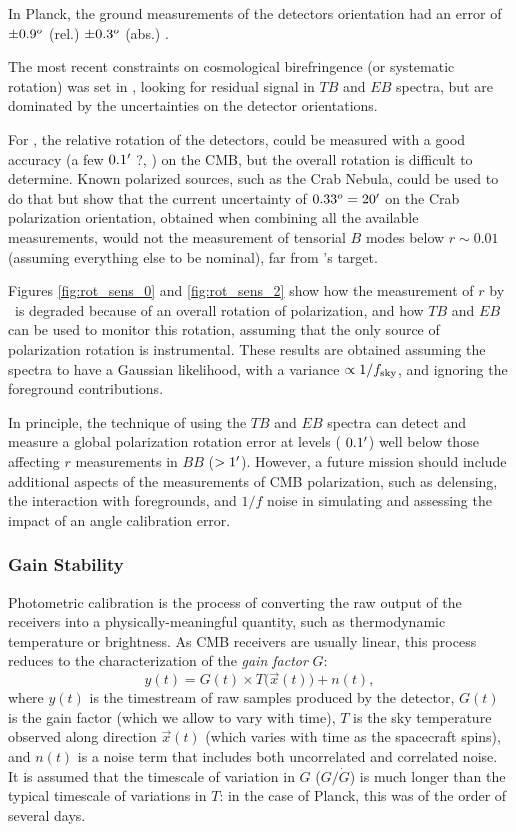 \documentclass[PICOReport.tex]{subfiles}
\begin{document}
In Planck, the ground measurements of the detectors orientation had an error of $\pm 0.9^o$ (rel.) $\pm 0.3^o$ (abs.) \citep{Rosset+2010}.

The most recent constraints on cosmological birefringence (or systematic rotation) was set in \citet{Planck2016_XLIX}, looking for residual signal in $TB$ and $EB$ spectra, but are dominated by the uncertainties on the detector orientations.

For \pico, the relative rotation of the detectors, could be measured with a good accuracy (a few $0.1'$ ?, ) on the CMB, but the overall rotation is difficult to determine.
Known polarized sources, such as the Crab Nebula, could be used to do that but \citet{Aumont+2018} show that the current uncertainty of $0.33^o = 20'$ on the Crab polarization orientation, obtained when combining all the available measurements, 
would not the measurement of tensorial $B$ modes below $r \sim 0.01$ (assuming everything else to be nominal), far from \pico's target.

Figures \ref{fig:rot_sens_0} and \ref{fig:rot_sens_2} show how the measurement of $r$ by \pico\ is degraded because of an overall rotation of polarization, and how $TB$ and $EB$ can be used to monitor this rotation, assuming that the only source of polarization rotation is instrumental.
These results are obtained assuming the spectra to have a Gaussian likelihood, with a variance $\propto 1/f_{\rm sky}$, and ignoring the foreground contributions.

In principle, the technique of using the $TB$ and $EB$ spectra can detect and measure a global polarization rotation error at levels ($~0.1 '$) well below those affecting $r$ measurements in $BB$ ($> 1 '$).  However, a future mission should include additional aspects of the measurements of CMB polarization, such as delensing, the interaction with foregrounds, and $1/f$ noise in simulating and assessing the impact of an angle calibration error.

\subsubsection{Gain Stability}
\label{sec:gain}
Photometric calibration is the process of converting the raw output of the receivers into a physically-meaningful quantity, such as thermodynamic temperature or brightness. As CMB receivers are usually linear, this process reduces to the characterization of the \emph{gain factor} $G$:
\begin{equation}
\label{eq:gainStability:Response}
y(t) = G(t) \times T\bigl(\vec{x}(t)\bigr) + n(t),
\end{equation}
where $y(t)$ is the timestream of raw samples produced by the detector, $G(t)$ is the gain factor (which we allow to vary with time), $T$ is the sky temperature observed along direction $\vec{x}(t)$ (which varies with time as the spacecraft spins), and $n(t)$ is a noise term that includes both uncorrelated and correlated noise. It is assumed that the timescale of variation in $G$ ($G / \dot{G}$) is much longer than the typical timescale of variations in $T$: in the case of Planck, this was of the order of several days.
\end{document}
